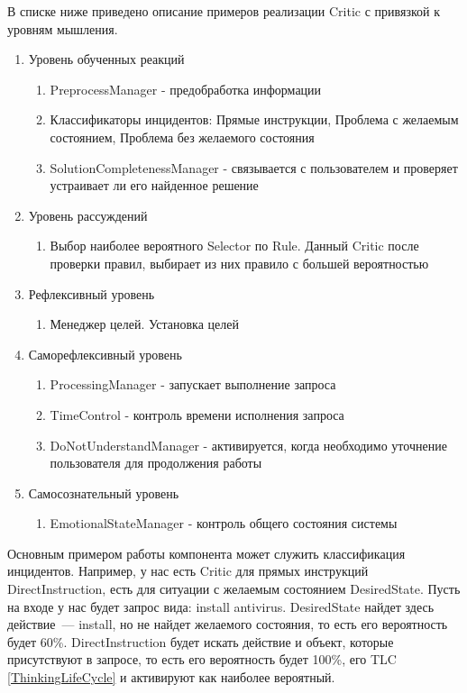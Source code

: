 В списке ниже приведено описание примеров реализации Critic с привязкой к уровням мышления.
\begin{enumerate}
	\item Уровень обученных реакций
	\begin{enumerate}
		\item PreprocessManager - предобработка информации
		\item Классификаторы инцидентов: Прямые инструкции, Проблема с желаемым состоянием, Проблема без желаемого состояния
		\item SolutionCompletenessManager - связывается с пользователем и проверяет устраивает ли его найденное решение
	\end{enumerate}
	\item Уровень рассуждений
	\begin{enumerate}
		\item Выбор наиболее вероятного Selector по Rule. Данный Critic после проверки правил, выбирает из них правило с большей вероятностью
	\end{enumerate}
	\item Рефлексивный уровень
	\begin{enumerate}
		\item Менеджер целей. Установка целей
	\end{enumerate}
	\item Саморефлексивный уровень
	\begin{enumerate}
		\item ProcessingManager - запускает выполнение запроса
		\item TimeControl - контроль времени исполнения запроса
		\item DoNotUnderstandManager - активируется, когда необходимо уточнение пользователя для продолжения работы
	\end{enumerate}
	\item Самосознательный уровень
	\begin{enumerate}
		\item EmotionalStateManager - контроль общего состояния системы
	\end{enumerate} 
\end{enumerate} \par
Основным примером работы компонента может служить классификация инцидентов. Например, у нас есть Critic для прямых инструкций DirectInstruction, есть для ситуации с желаемым состоянием DesiredState. Пусть на входе у нас будет запрос вида: install antivirus. DesiredState найдет здесь действие~--- install, но не найдет желаемого состояния, то есть его вероятность будет 60\%. DirectInstruction будет искать действие и объект, которые присутствуют в запросе, то есть его вероятность будет 100\%, его TLC \ref{ThinkingLifeCycle} и активируют как наиболее вероятный. \par
